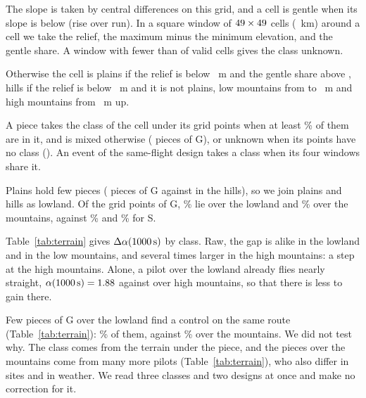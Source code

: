 \documentclass[aps,prl,twocolumn,superscriptaddress,nofootinbib]{revtex4-2}
\newcommand{\aK}{\alpha(\LtLagOne\,\mathrm{s})}
\begin{document}
The slope is taken by central differences on this grid, and a cell is gentle when its slope is below
\TnGentle{} (rise over run). In a square window of $49\times49$ cells (\TnWindowKm~km)
around a cell we take the relief, the maximum minus the minimum elevation, and the gentle share. A
window with fewer than \TnCoverage{} of valid cells gives the class unknown.

Otherwise the cell is plains if the relief is below \TnPlainsRelief~m and the gentle share above
\TnPlainsGentle, hills if the relief is below \TnHillsRelief~m and it is not plains, low mountains from
\TnHillsRelief{} to \TnLowRelief~m and high mountains from \TnLowRelief~m up.

A piece takes the class of the cell under its grid points when at least \TnMajority\% of them are in
it, and is mixed otherwise (\TnPiecesMixedG{} pieces of G), or unknown when its points have no class
(\TnPiecesUnknownG). An event of the same-flight design takes a class when its four windows share it.

Plains hold few pieces (\TnPiecesPlainsG{} pieces of G against \TnPiecesHillsG{} in the hills), so we
join plains and hills as lowland. Of the grid points of G, \TnShareLowlandG\% lie over the lowland and
\TnShareMountainG\% over the mountains, against \TnShareLowlandS\% and \TnShareMountainS\% for S.

Table~\ref{tab:terrain} gives $\Delta\aK$ by class. Raw, the gap is alike in the lowland and in the low
mountains, and several times larger in the high mountains: a step at the high mountains. Alone, a pilot
over the lowland already flies nearly straight, $\aK = \LtTnAlphaSLowland$ against \LtTnAlphaSHigh{}
over high mountains, so that there is less to gain there.

Few pieces of G over the lowland find a control on the same route (Table~\ref{tab:terrain}):
\TnRouteMatchedShareLowland\% of them, against \TnRouteMatchedShareMountain\% over the mountains. We
did not test why. The class comes from the terrain under the piece, and the pieces over the mountains
come from many more pilots (Table~\ref{tab:terrain}), who also differ in sites and in weather. We read
three classes and two designs at once and make no correction for it.
\end{document}
